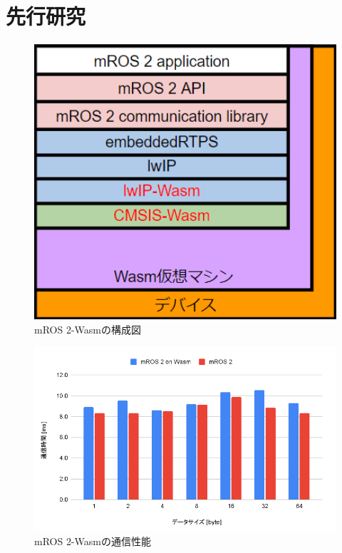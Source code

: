 \chapter{先行研究}
\begin{figure}[ht]
    \centering
    \includegraphics[width=13cm]{images/fig3_mros2-wasm_configuration.png}
    \caption{mROS 2-Wasmの構成図}
    \label{fig:mros2-wasm_configuration}
\end{figure}
\begin{figure}[ht]
    \centering
    \includegraphics[width=13cm]{images/fig3_kakimoto_pubsubtime.png}
    \caption{mROS 2-Wasmの通信性能}
    \label{fig:mros2-wasm_configuration}
\end{figure}
